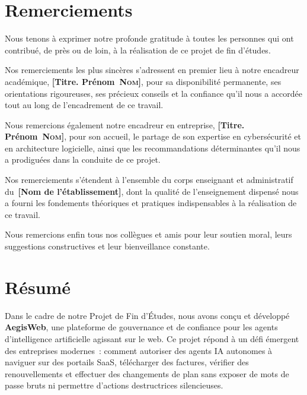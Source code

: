 \documentclass[12pt,a4paper,oneside]{report}
\begin{document}
\clearpage
\chapter*{Remerciements}
\thispagestyle{plain}

Nous tenons à exprimer notre profonde gratitude à toutes les personnes
qui ont contribué, de près ou de loin, à la réalisation de ce projet de
fin d'études.

\medskip
Nos remerciements les plus sincères s'adressent en premier lieu à notre
encadreur académique, \textbf{[Titre. Prénom~\textsc{Nom}]}, pour sa
disponibilité permanente, ses orientations rigoureuses, ses précieux
conseils et la confiance qu'il nous a accordée tout au long de
l'encadrement de ce travail.

\medskip
Nous remercions également notre encadreur en entreprise,
\textbf{[Titre. Prénom~\textsc{Nom}]}, pour son accueil, le partage de
son expertise en cybersécurité et en architecture logicielle, ainsi que
les recommandations déterminantes qu'il nous a prodiguées dans la conduite
de ce projet.

\medskip
Nos remerciements s'étendent à l'ensemble du corps enseignant et
administratif du~\textbf{[Nom de l'établissement]}, dont la qualité de
l'enseignement dispensé nous a fourni les fondements théoriques et
pratiques indispensables à la réalisation de ce travail.

\medskip
Nous remercions enfin tous nos collègues et amis pour leur soutien moral,
leurs suggestions constructives et leur bienveillance constante.

\clearpage
\chapter*{Résumé}
\thispagestyle{plain}

Dans le cadre de notre Projet de Fin d'Études, nous avons conçu et
développé \textbf{AegisWeb}, une plateforme de gouvernance et de confiance
pour les agents d'intelligence artificielle agissant sur le web. Ce projet
répond à un défi émergent des entreprises modernes~: comment autoriser des
agents IA autonomes à naviguer sur des portails SaaS, télécharger des
factures, vérifier des renouvellements et effectuer des changements de
plan sans exposer de mots de passe bruts ni permettre d'actions
destructrices silencieuses.
\end{document}
